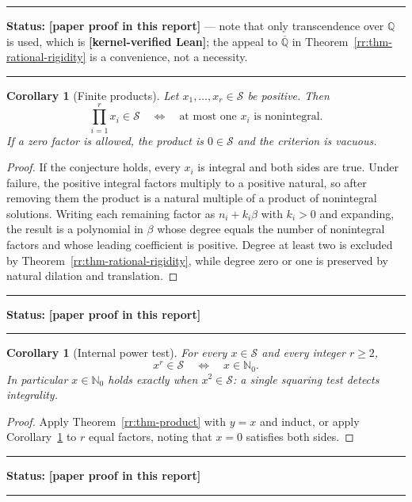 \documentclass[11pt,oneside]{article}
\newtheorem{corollary}[theorem]{Corollary}
\theoremstyle{definition}
\theoremstyle{remark}
\newcommand{\Nzero}{\mathbb N_0}
\newcommand{\Q}{\mathbb Q}
\newcommand{\Abar}{\overline{\mathbb Q}}
\newcommand{\Sol}{\mathcal S}
\newcommand{\statuslean}{\textcolor{leanblue}{\textbf{[kernel-verified Lean]}}}
\newcommand{\statusnew}{\textcolor{newgreen}{\textbf{[paper proof in this report]}}}
\newenvironment{statusbox}[1]
{\begin{center}\begin{minipage}{0.94\textwidth}\raggedright\hbadness=10000\hrule
\vspace{0.45em}\textbf{Status:} #1\par\vspace{0.35em}}
{\vspace{0.35em}\hrule\end{minipage}\end{center}}
\begin{document}
\begin{statusbox}{\statusnew{} --- note that only transcendence over $\Q$ is used, which is
\statuslean{}; the appeal to $\Abar$ in Theorem~\ref{rr:thm-rational-rigidity} is a
convenience, not a necessity.}
\end{statusbox}

\begin{corollary}[Finite products]
\label{rr:cor-finite-products}
Let $x_1,\ldots,x_r\in\Sol$ be positive.  Then
\[
 \prod_{i=1}^r x_i\in\Sol
 \quad\Longleftrightarrow\quad
 \text{at most one }x_i\text{ is nonintegral} .
\]
If a zero factor is allowed, the product is $0\in\Sol$ and the criterion is vacuous.
\end{corollary}

\begin{proof}
If the conjecture holds, every $x_i$ is integral and both sides are true.  Under failure,
the positive integral factors multiply to a positive natural, so after removing them the
product is a natural multiple of a product of nonintegral solutions.  Writing each remaining
factor as $n_i+k_i\beta$ with $k_i>0$ and expanding, the result is a polynomial in $\beta$
whose degree equals the number of nonintegral factors and whose leading coefficient is
positive.  Degree at least two is excluded by Theorem~\ref{rr:thm-rational-rigidity}, while
degree zero or one is preserved by natural dilation and translation.
\end{proof}

\begin{statusbox}{\statusnew}
\end{statusbox}

\begin{corollary}[Internal power test]
\label{rr:cor-power-test}
For every $x\in\Sol$ and every integer $r\ge2$,
\[
 x^r\in\Sol
 \quad\Longleftrightarrow\quad
 x\in\Nzero .
\]
In particular $x\in\Nzero$ holds exactly when $x^2\in\Sol$: a single squaring test detects
integrality.
\end{corollary}

\begin{proof}
Apply Theorem~\ref{rr:thm-product} with $y=x$ and induct, or apply
Corollary~\ref{rr:cor-finite-products} to $r$ equal factors, noting that $x=0$ satisfies both
sides.
\end{proof}

\begin{statusbox}{\statusnew}
\end{statusbox}
\end{document}
